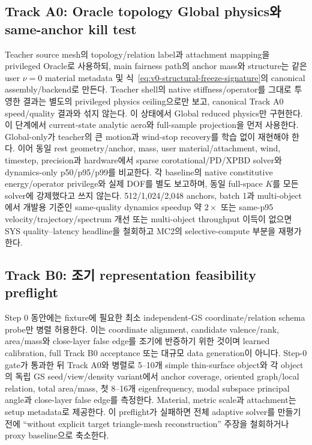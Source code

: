 \documentclass[11pt,a4paper]{article}
\begin{document}
\subsection{Track A0: Oracle topology Global physics와 same-anchor kill test}

Teacher source mesh의 topology/relation label과 attachment mapping을 privileged Oracle로 사용하되,
main fairness path의 anchor mass와 structure는 같은 user \(\nu=0\) material metadata 및
식~\eqref{eq:v0-structural-freeze-signature}의 canonical assembly/backend로 만든다.
Teacher shell의 native stiffness/operator를 그대로 투영한 결과는 별도의 privileged physics ceiling으로만 보고,
canonical Track A0 speed/quality 결과와 섞지 않는다. 이 상태에서 Global reduced physics만 구현한다.
이 단계에서 current-state analytic aero와 full-sample projection을 먼저 사용한다.
Global-only가 teacher의 큰 motion과 wind-stop recovery를 학습 없이 재현해야 한다.
이어 동일 rest geometry/anchor, mass, user material/attachment, wind, timestep,
precision과 hardware에서
sparse corotational/PD/XPBD solver와 dynamics-only p50/p95/p99를 비교한다.
각 baseline의 native constitutive energy/operator privilege와 실제 DOF를 별도 보고하며,
동일 full-space \(K\)를 모든 solver에 강제했다고 쓰지 않는다.
512/1,024/2,048 anchors, batch 1과 multi-object에서
개발용 기준인 same-quality dynamics speedup 약 \(2\times\) 또는
same-p95 velocity/trajectory/spectrum 개선 또는 multi-object throughput 이득이 없으면
SYS quality--latency headline을 철회하고 MC2의 selective-compute 부분을 재평가한다.

\subsection{Track B0: 조기 representation feasibility preflight}

Step 0 동안에는 fixture에 필요한 최소 independent-GS coordinate/relation schema probe만 병렬 허용한다.
이는 coordinate alignment, candidate valence/rank, area/mass와 close-layer false edge를 조기에
반증하기 위한 것이며 learned calibration, full Track B0 acceptance 또는 대규모 data generation이 아니다.
Step-0 gate가 통과한 뒤 Track A0와 병렬로 5--10개 simple thin-surface object와
각 object의 독립 GS seed/view/density variant에서
anchor coverage, oriented graph/local relation, total area/mass,
첫 8--16개 eigenfrequency, modal subspace principal angle과 close-layer false edge를 측정한다.
Material, metric scale과 attachment는 setup metadata로 제공한다.
이 preflight가 실패하면 전체 adaptive solver를 만들기 전에
``without explicit target triangle-mesh reconstruction'' 주장을 철회하거나 proxy baseline으로 축소한다.
\end{document}
